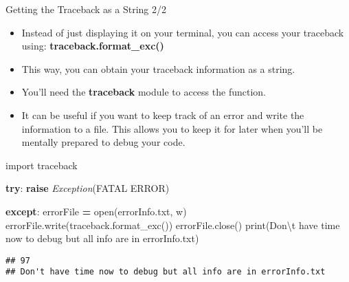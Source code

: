 \documentclass[
  8pt,
  ignorenonframetext,
]{beamer}
\newenvironment{Shaded}{\begin{snugshade}}{\end{snugshade}}
\newcommand{\BuiltInTok}[1]{#1}
\newcommand{\CharTok}[1]{\textcolor[rgb]{0.31,0.60,0.02}{#1}}
\newcommand{\ControlFlowTok}[1]{\textcolor[rgb]{0.13,0.29,0.53}{\textbf{#1}}}
\newcommand{\ImportTok}[1]{#1}
\newcommand{\NormalTok}[1]{#1}
\newcommand{\OperatorTok}[1]{\textcolor[rgb]{0.81,0.36,0.00}{\textbf{#1}}}
\newcommand{\PreprocessorTok}[1]{\textcolor[rgb]{0.56,0.35,0.01}{\textit{#1}}}
\newcommand{\StringTok}[1]{\textcolor[rgb]{0.31,0.60,0.02}{#1}}
\begin{document}
\begin{frame}[fragile]{Getting the Traceback as a String 2/2}
\protect\hypertarget{getting-the-traceback-as-a-string-22}{}
\begin{itemize}
\item
  Instead of just displaying it on your terminal, you can access your
  traceback using: \textbf{traceback.format\_exc()}
\item
  This way, you can obtain your traceback information as a string.
\item
  You'll need the \textbf{traceback} module to access the function.
\item
  It can be useful if you want to keep track of an error and write the
  information to a file. This allows you to keep it for later when
  you'll be mentally prepared to debug your code.
\end{itemize}

\begin{Shaded}
\begin{Highlighting}[]
\ImportTok{import}\NormalTok{ traceback}

\ControlFlowTok{try}\NormalTok{:}
  \ControlFlowTok{raise} \PreprocessorTok{Exception}\NormalTok{(}\StringTok{\textquotesingle{}FATAL ERROR\textquotesingle{}}\NormalTok{)}

\ControlFlowTok{except}\NormalTok{:}
\NormalTok{  errorFile }\OperatorTok{=} \BuiltInTok{open}\NormalTok{(}\StringTok{\textquotesingle{}errorInfo.txt\textquotesingle{}}\NormalTok{, }\StringTok{\textquotesingle{}w\textquotesingle{}}\NormalTok{)}
\NormalTok{  errorFile.write(traceback.format\_exc())}
\NormalTok{  errorFile.close()}
  \BuiltInTok{print}\NormalTok{(}\StringTok{\textquotesingle{}Don}\CharTok{\textbackslash{}\textquotesingle{}}\StringTok{t have time now to debug but all info are in errorInfo.txt\textquotesingle{}}\NormalTok{)}
\end{Highlighting}
\end{Shaded}

\begin{verbatim}
## 97
## Don't have time now to debug but all info are in errorInfo.txt
\end{verbatim}
\end{frame}
\end{document}
